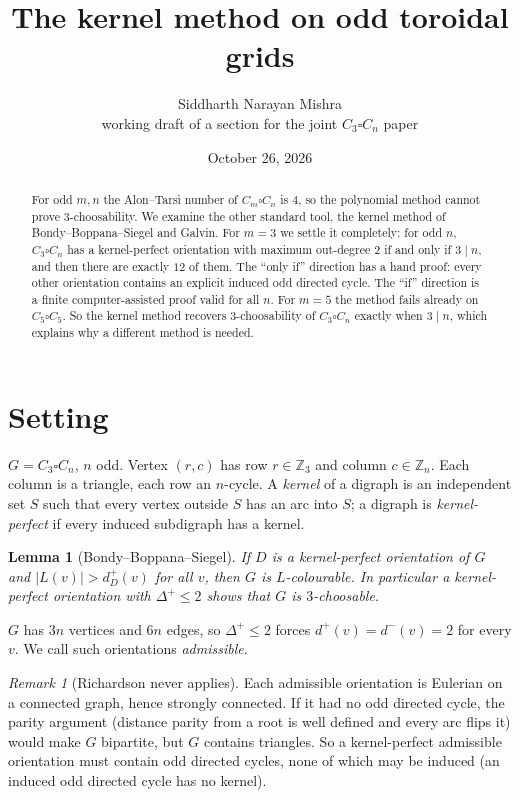 \documentclass[11pt]{article}
\title{The kernel method on odd toroidal grids}
\author{Siddharth Narayan Mishra \\ \small working draft of a section for the joint $C_3\square C_n$ paper}
\date{October 26, 2026}
\theoremstyle{plain}
\newtheorem{lemma}[theorem]{Lemma}
\theoremstyle{definition}
\theoremstyle{remark}
\newtheorem*{remark}{Remark}
\begin{document}
\maketitle

\begin{abstract}
For odd $m,n$ the Alon--Tarsi number of $C_m\square C_n$ is $4$, so the polynomial
method cannot prove 3-choosability. We examine the other standard tool, the kernel
method of Bondy--Boppana--Siegel and Galvin. For $m=3$ we settle it completely: for odd
$n$, $C_3\square C_n$ has a kernel-perfect orientation with maximum out-degree $2$ if and
only if $3\mid n$, and then there are exactly $12$ of them. The ``only if'' direction has
a hand proof: every other orientation contains an explicit induced odd directed cycle.
The ``if'' direction is a finite computer-assisted proof valid for all $n$. For $m=5$ the
method fails already on $C_5\square C_5$. So the kernel method recovers 3-choosability of
$C_3\square C_n$ exactly when $3\mid n$, which explains why a different method is needed.
\end{abstract}

\section{Setting}

$G=C_3\square C_n$, $n$ odd. Vertex $(r,c)$ has row $r\in\mathbb Z_3$ and column
$c\in\mathbb Z_n$. Each column is a triangle, each row an $n$-cycle. A \emph{kernel} of a
digraph is an independent set $S$ such that every vertex outside $S$ has an arc into $S$;
a digraph is \emph{kernel-perfect} if every induced subdigraph has a kernel.

\begin{lemma}[Bondy--Boppana--Siegel]
If $D$ is a kernel-perfect orientation of $G$ and $|L(v)|>d^+_D(v)$ for all $v$, then $G$
is $L$-colourable. In particular a kernel-perfect orientation with $\Delta^+\le 2$ shows
that $G$ is $3$-choosable.
\end{lemma}

$G$ has $3n$ vertices and $6n$ edges, so $\Delta^+\le 2$ forces $d^+(v)=d^-(v)=2$ for
every $v$. We call such orientations \emph{admissible}.

\begin{remark}[Richardson never applies]
Each admissible orientation is Eulerian on a connected graph, hence strongly connected.
If it had no odd directed cycle, the parity argument (distance parity from a root is well
defined and every arc flips it) would make $G$ bipartite, but $G$ contains triangles.
So a kernel-perfect admissible orientation must contain odd directed cycles, none of
which may be induced (an induced odd directed cycle has no kernel).
\end{remark}
\end{document}
